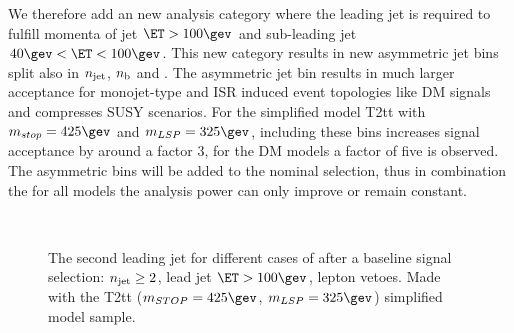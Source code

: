 We therefore add an new analysis category where the leading jet is required to fulfill 
momenta of jet $\ET>100\gev$ and sub-leading jet $40\gev<\ET<100\gev$. This new category 
results in new asymmetric jet bins split also in $n_{\text{jet}}$, $n_{\text{b}}$ and \HT. The asymmetric jet bin
results in much larger acceptance for monojet-type and ISR induced event topologies like DM signals
and compresses SUSY scenarios. 
For the simplified model T2tt with $m_{stop}=425\gev$ and $m_{LSP}=325\gev$, 
including these bins increases signal acceptance by around a factor 3, for the DM models a factor of five is observed.
The asymmetric bins will be added to the nominal selection, thus in combination the for all models the analysis power can only improve or remain constant.
\begin{figure}[h!]
  \centering
  ~~
  \\
  \caption{\label{fig:asymMotivation} The second leading jet \PT for different
  cases of \HT after a baseline signal selection: $n_{\text{jet}}\geq2$, lead jet
  $\ET>100\gev$, lepton vetoes. Made with the T2tt ($m_{STOP}=425\gev$, $m_{LSP}=325\gev$) simplified model sample.}
\end{figure}

